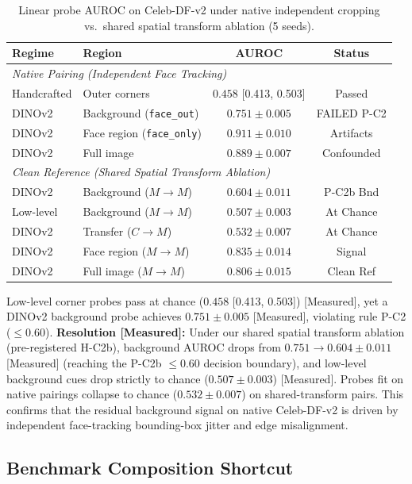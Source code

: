 \documentclass[10pt,twocolumn]{article}
\begin{document}
\begin{table}[h]
\small
\centering
\caption{Linear probe AUROC on Celeb-DF-v2 under native independent cropping vs.\ shared spatial transform ablation (5 seeds).}
\begin{tabular}{llcc}
\toprule
Regime & Region & AUROC & Status \\
\midrule
\multicolumn{4}{l}{\textit{Native Pairing (Independent Face Tracking)}} \\
Handcrafted & Outer corners & $0.458$ [0.413, 0.503] & Passed \\
DINOv2 & Background (\texttt{face\_out}) & $0.751\pm0.005$ & FAILED P-C2 \\
DINOv2 & Face region (\texttt{face\_only}) & $0.911\pm0.010$ & Artifacts \\
DINOv2 & Full image & $0.889\pm0.007$ & Confounded \\
\midrule
\multicolumn{4}{l}{\textit{Clean Reference (Shared Spatial Transform Ablation)}} \\
DINOv2 & Background ($M\to M$) & $0.604\pm0.011$ & P-C2b Bnd \\
Low-level & Background ($M\to M$) & $0.507\pm0.003$ & At Chance \\
DINOv2 & Transfer ($C\to M$) & $0.532\pm0.007$ & At Chance \\
DINOv2 & Face region ($M\to M$) & $0.835\pm0.014$ & Signal \\
DINOv2 & Full image ($M\to M$) & $0.806\pm0.015$ & Clean Ref \\
\bottomrule
\end{tabular}
\end{table}

Low-level corner probes pass at chance ($0.458$ [0.413, 0.503]) [Measured], yet a DINOv2 background probe achieves $0.751 \pm 0.005$ [Measured], violating rule P-C2 ($\leq 0.60$).
\textbf{Resolution [Measured]:} Under our shared spatial transform ablation (pre-registered H-C2b), background AUROC drops from $0.751 \to 0.604 \pm 0.011$ [Measured] (reaching the P-C2b $\leq 0.60$ decision boundary), and low-level background cues drop strictly to chance ($0.507 \pm 0.003$) [Measured]. Probes fit on native pairings collapse to chance ($0.532 \pm 0.007$) on shared-transform pairs. This confirms that the residual background signal on native Celeb-DF-v2 is driven by independent face-tracking bounding-box jitter and edge misalignment.

\subsection{Benchmark Composition Shortcut}
\end{document}
